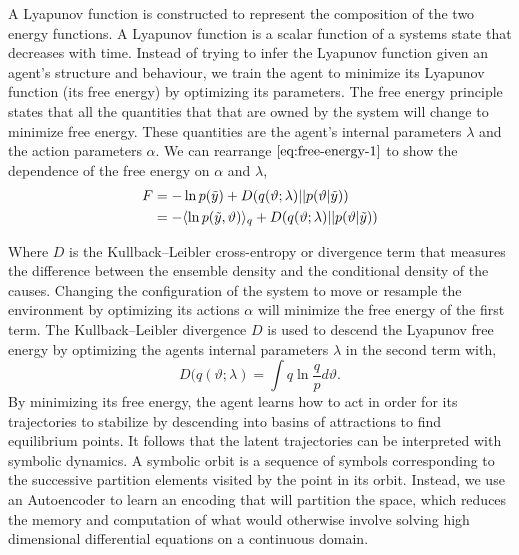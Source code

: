 \documentclass{article}
\begin{document}
A Lyapunov function is constructed to represent the composition of the two energy functions. A Lyapunov function is a scalar function of a systems state that decreases with time. Instead of trying to infer the Lyapunov function given an agent's structure and behaviour, we train the agent to minimize its Lyapunov function (its free energy) by optimizing its parameters. The free energy principle states that all the quantities that that are owned by the system will change to minimize free energy. These quantities are the agent's internal parameters $\lambda$ and the action parameters $\alpha$. We can rearrange $\eqref{eq:free-energy-1}$ to show the dependence of the free energy on $\alpha$ and $\lambda$,
\begin{align}\label{eq:free-energy-2}
\begin{split}
F &= -\ln p (\Tilde{y}) + D(q(\vartheta;\lambda) || p(\vartheta|\Tilde{y}))\\
&=  - \langle \ln p(\Tilde{y},\vartheta) \rangle_q + D(q(\vartheta;\lambda) || p(\vartheta|\Tilde{y}))
\end{split}
\end{align}

Where $D$ is the Kullback–Leibler cross-entropy or divergence term that measures the difference between the ensemble density and the conditional density of the causes. Changing the configuration of the system to move or resample the environment by optimizing its actions $\alpha$ will minimize the free energy of the first term. The Kullback–Leibler divergence $D$ is used to descend the Lyapunov free energy by optimizing the agents internal parameters $\lambda$ in the second term with,
\[
D(q(\vartheta;\lambda) = \int q \ln \frac{q}{p} d\vartheta.
\]
By minimizing its free energy, the agent learns how to act in order for its trajectories to stabilize by descending into basins of attractions to find equilibrium points. It follows that the latent trajectories can be interpreted with symbolic dynamics. A symbolic orbit is a sequence of symbols corresponding to the successive partition elements visited by the point in its orbit. Instead, we use an Autoencoder to learn an encoding that will partition the space, which reduces the memory and computation of what would otherwise involve solving high dimensional differential equations on a continuous domain.

\end{document}

